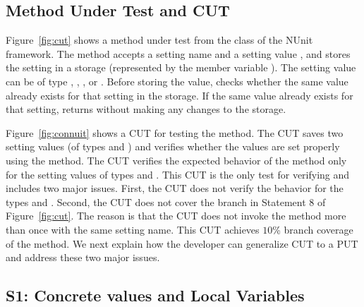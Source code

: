 \subsection{Method Under Test and CUT}

Figure~\ref{fig:cut} shows a method under test  from the  class of the NUnit framework. The  method accepts a setting name  and a setting value , and stores the setting in a storage (represented by the member variable ). The setting value can be of type , , , or . Before storing the value,  checks whether the same value already exists for that setting in the storage. If the same value already exists for that setting,  returns without making any changes to the storage.

Figure~\ref{fig:connuit} shows a CUT for testing the  method. The CUT saves two setting values (of types  and ) and verifies whether the values are set properly using the  method. The CUT verifies the expected behavior of the  method only for the setting values of types  and . This CUT is the only test for verifying  and includes two major issues. First, the CUT does not verify the behavior for the types  and . Second, the CUT does not cover the  branch in Statement 8 of Figure~\ref{fig:cut}. The reason is that the CUT does not invoke the  method more than once with the same setting name. This CUT achieves $10$\% branch coverage of the  method. We next explain how the developer can generalize CUT to a PUT and address these two major issues.

\subsection{S1: Concrete values and Local Variables}

